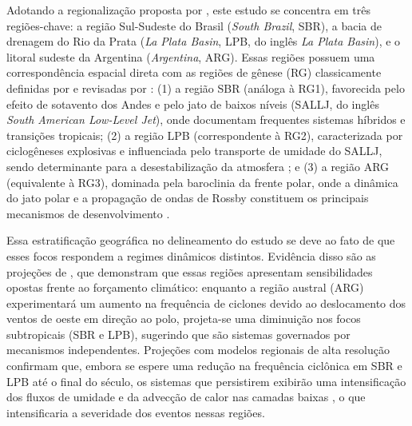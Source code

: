 \label{sec:definicion_regiones}%
Adotando a regionalização proposta por \citet{gramcianinov2019properties}, este estudo se concentra em três regiões-chave: a região Sul-Sudeste do Brasil (\textit{South Brazil}, SBR), a bacia de drenagem do Rio da Prata (\textit{La Plata Basin}, LPB, do inglês \textit{La Plata Basin}), e o litoral sudeste da Argentina (\textit{Argentina}, ARG). Essas regiões possuem uma correspondência espacial direta com as regiões de gênese (RG) classicamente definidas por \citet{reboita2010south} e revisadas por \citet{reboita2026meteorology}: (1) a região SBR (análoga à RG1), favorecida pelo efeito de sotavento dos Andes e pelo jato de baixos níveis (SALLJ, do inglês \textit{South American Low-Level Jet}), onde \citet{reboita2022from} documentam frequentes sistemas híbridos e transições tropicais; (2) a região LPB (correspondente à RG2), caracterizada por ciclogêneses explosivas e influenciada pelo transporte de umidade do SALLJ, sendo determinante para a desestabilização da atmosfera \citep{crespo2020potential}; e (3) a região ARG (equivalente à RG3), dominada pela baroclinia da frente polar, onde a dinâmica do jato polar e a propagação de ondas de Rossby constituem os principais mecanismos de desenvolvimento \citep{simmonds2000variability}.

Essa estratificação geográfica no delineamento do estudo se deve ao fato de que esses focos respondem a regimes dinâmicos distintos. Evidência disso são as projeções de \citet{dejesus2021multimodel}, que demonstram que essas regiões apresentam sensibilidades opostas frente ao forçamento climático: enquanto a região austral (ARG) experimentará um aumento na frequência de ciclones devido ao deslocamento dos ventos de oeste em direção ao polo, projeta-se uma diminuição nos focos subtropicais (SBR e LPB), sugerindo que são sistemas governados por mecanismos independentes. Projeções com modelos regionais de alta resolução confirmam que, embora se espere uma redução na frequência ciclônica em SBR e LPB até o final do século, os sistemas que persistirem exibirão uma intensificação dos fluxos de umidade e da advecção de calor nas camadas baixas \citep{gramcianinov2024early}, o que intensificaria a severidade dos eventos nessas regiões.


